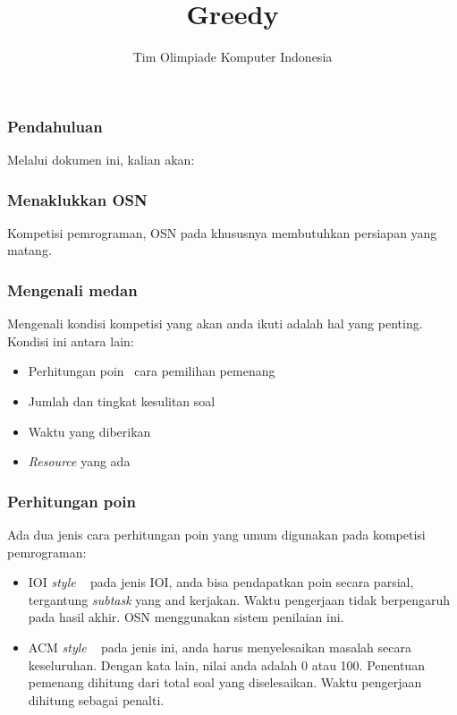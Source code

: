  

\title{Greedy}
\author{Tim Olimpiade Komputer Indonesia}
\date{}



\begin{frame}
	\titlepage
\end{frame}

\begin{frame}
	\frametitle{Pendahuluan}
	Melalui dokumen ini, kalian akan:

\end{frame}
	
\begin{frame}
	\frametitle{Menaklukkan OSN}
	Kompetisi pemrograman, OSN pada khususnya membutuhkan persiapan yang matang.
	
	
\end{frame}

\begin{frame}
	\frametitle{Mengenali medan}
	Mengenali kondisi kompetisi yang akan anda ikuti adalah hal yang penting. Kondisi ini antara lain:
	\begin{itemize}
		\item Perhitungan poin \ cara pemilihan pemenang
		\item Jumlah dan tingkat kesulitan soal
		\item Waktu yang diberikan
		\item \textit{Resource} yang ada
	\end{itemize}
\end{frame}


\begin{frame}
	\frametitle{Perhitungan poin}
	Ada dua jenis cara perhitungan poin yang umum digunakan pada kompetisi pemrograman:
	\begin{itemize}
		\item IOI \textit{style}
		~
		pada jenis IOI, anda bisa pendapatkan poin secara parsial, tergantung \textit{subtask} yang and kerjakan. Waktu pengerjaan tidak berpengaruh pada hasil akhir. OSN menggunakan sistem penilaian ini.
		
		\item ACM \textit{style}
		~
		pada jenis ini, anda harus menyelesaikan masalah secara keseluruhan. Dengan kata lain, nilai anda adalah 0 atau 100. Penentuan pemenang dihitung dari total soal yang diselesaikan.  Waktu pengerjaan dihitung sebagai penalti.
	\end{itemize}
\end{frame}

